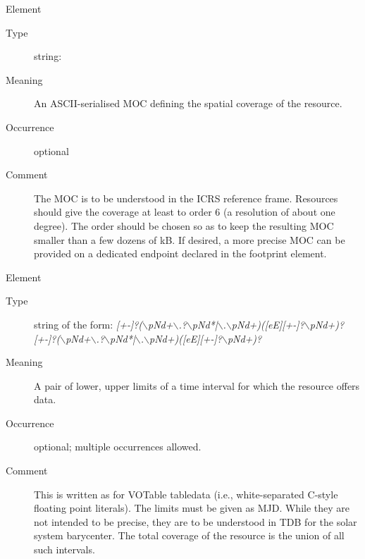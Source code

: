 \documentclass[11pt,a4paper]{ivoa}
\begin{document}
\begin{generated}
\begin{bigdescription}
\begin{description}
\end{description}
\item[Element \xmlel{spatial}]
\begin{description}
\item[Type] string: 
\item[Meaning] 
                  An ASCII-serialised MOC defining the spatial coverage 
                  of the resource.
               
\item[Occurrence] optional
\item[Comment] 
                  The MOC is to be understood in the ICRS reference frame.
                  Resources should give the coverage at least to order 6
                  (a resolution of about one degree).  The order should be
                  chosen so as to keep the resulting MOC smaller than a few
                  dozens of kB.  If desired, a more precise MOC can be provided
                  on a dedicated endpoint declared in the footprint element.
               

\end{description}
\item[Element \xmlel{temporal}]
\begin{description}
\item[Type] string of the form: \emph{[+-]?($\backslash$p{Nd}+$\backslash$.?$\backslash$p{Nd}*|$\backslash$.$\backslash$p{Nd}+)([eE][+-]?$\backslash$p{Nd}+)? [+-]?($\backslash$p{Nd}+$\backslash$.?$\backslash$p{Nd}*|$\backslash$.$\backslash$p{Nd}+)([eE][+-]?$\backslash$p{Nd}+)?}
\item[Meaning] 
                  A pair of lower, upper limits of a time interval 
                  for which the resource offers data.
               
\item[Occurrence] optional; multiple occurrences allowed.

\item[Comment] 
                  This is written as for VOTable tabledata (i.e., 
                  white-separated C-style floating point literals).
                  The limits must be given as MJD.  While they
                  are not intended to be precise, they are to be understood
                  in TDB for the solar system barycenter.  The total coverage
                  of the resource is the union of all such intervals.
               


\end{description}
\end{bigdescription}
\end{generated}
\end{document}
